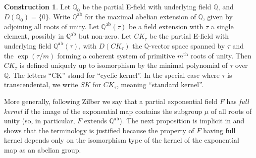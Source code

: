 \documentclass[12pt]{amsart}
\theoremstyle{definition}
\newtheorem{construction}[prop]{Construction}
\begin{document}
\begin{construction}
 Let ${\ensuremath{\mathbb{Q}}}_0$ be the partial E-field with underlying field ${\ensuremath{\mathbb{Q}}}$, and
 $D({\ensuremath{\mathbb{Q}}}_0) = \{0\}$. Write ${\ensuremath{\mathbb{Q}}}^{\mathrm{ab}}$ for the maximal abelian
 extension of ${\ensuremath{\mathbb{Q}}}$, given by adjoining all roots of unity. Let
 ${\ensuremath{\mathbb{Q}}}^{\mathrm{ab}}(\tau)$ be a field extension with $\tau$ a single
 element, possibly in ${\ensuremath{\mathbb{Q}}}^{\mathrm{ab}}$ but non-zero. Let $CK_\tau$ be the partial E-field with underlying field ${\ensuremath{\mathbb{Q}}}^{\mathrm{ab}}(\tau)$, with $D(CK_\tau)$ the ${\ensuremath{\mathbb{Q}}}$-vector space spanned by $\tau$ and the $\exp(\tau/m)$ forming a coherent system of primitive $m^{\mathrm{th}}$ roots of unity. Then $CK_\tau$ is defined uniquely up to isomorphism by the minimal polynomial of $\tau$ over ${\ensuremath{\mathbb{Q}}}$. The letters ``CK'' stand for ``cyclic kernel''. In the special case where $\tau$ is transcendental, we write $SK$ for $CK_\tau$, meaning ``standard kernel''.
\end{construction}

More generally, following Zilber we say that a partial exponential field $F$ has \emph{full kernel} if the image of the exponential map contains the subgroup $\mu$ of all roots of unity (so, in particular, $F$ extends ${{\ensuremath{\mathbb{Q}}}^{\mathrm{ab}}}$). The next proposition is implicit in \cite{Zilber05peACF0} and shows that the terminology is justified because the property of $F$ having full kernel depends only on the isomorphism type of the kernel of the exponential map as an abelian group.
\end{document}
